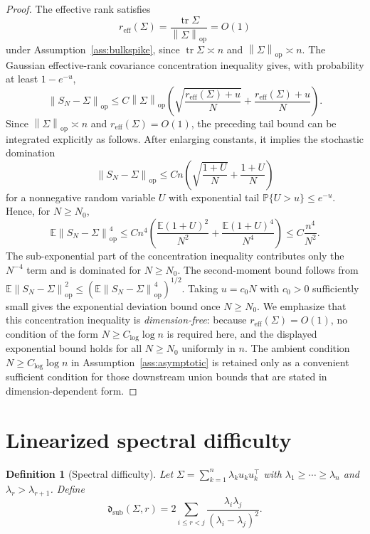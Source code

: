 \documentclass[11pt]{article}
\theoremstyle{tightplain}
\theoremstyle{tightdef}
\newtheorem{definition}[theorem]{Definition}
\DeclareMathOperator{\tr}{tr}
\DeclareMathOperator{\op}{op}
\newcommand{\E}{\mathbb E}
\newcommand{\Prob}{\mathbb P}
\newcommand{\norm}[1]{\left\lVert #1 \right\rVert}
\newcommand{\dsub}{\mathfrak d_{\mathrm{sub}}}
\begin{document}
\begin{proof}
The effective rank satisfies
\[
r_{\mathrm{eff}}(\Sigma)=\frac{\tr\Sigma}{\norm{\Sigma}_{\op}}=O(1)
\]
under Assumption~\ref{ass:bulkspike}, since $\tr\Sigma\asymp n$ and
$\norm{\Sigma}_{\op}\asymp n$. The Gaussian effective-rank covariance
concentration inequality \cite[Thm.~9]{KoltchinskiiLounici2017} gives, with
probability at least $1-e^{-u}$,
\[
\norm{S_N-\Sigma}_{\op}
\le
C\norm{\Sigma}_{\op}
\left(
\sqrt{\frac{r_{\mathrm{eff}}(\Sigma)+u}{N}}
+
\frac{r_{\mathrm{eff}}(\Sigma)+u}{N}
\right).
\]
Since $\norm{\Sigma}_{\op}\asymp n$ and
$r_{\mathrm{eff}}(\Sigma)=O(1)$, the preceding tail bound can be integrated
explicitly as follows. After enlarging constants, it implies the stochastic
domination
\[
\norm{S_N-\Sigma}_{\op}
\le
C n\left(\sqrt{\frac{1+U}{N}}+\frac{1+U}{N}\right)
\]
for a nonnegative random variable $U$ with exponential tail
$\Prob\{U>u\}\le e^{-u}$. Hence, for $N\ge N_0$,
\[
\E\norm{S_N-\Sigma}_{\op}^4
\le
C n^4\left(
\frac{\E(1+U)^2}{N^2}
+
\frac{\E(1+U)^4}{N^4}
\right)
\le
C\frac{n^4}{N^2}.
\]
The sub-exponential part of the concentration inequality contributes only the
$N^{-4}$ term and is dominated for $N\ge N_0$. The second-moment bound follows
from
$\E\norm{S_N-\Sigma}_{\op}^2\le(\E\norm{S_N-\Sigma}_{\op}^4)^{1/2}$.
Taking $u=c_0N$ with $c_0>0$ sufficiently small gives the exponential deviation
bound once $N\ge N_0$. We emphasize that this concentration inequality is
\emph{dimension-free}: because $r_{\mathrm{eff}}(\Sigma)=O(1)$, no condition of
the form $N\ge C_{\log}\log n$ is required here, and the displayed
exponential bound holds for all $N\ge N_0$ uniformly in $n$. The ambient condition $N\ge C_{\log}\log n$ in
Assumption~\ref{ass:asymptotic} is retained only as a convenient sufficient
condition for those downstream union bounds that are stated in
dimension-dependent form.
\end{proof}

\section{Linearized spectral difficulty}

\begin{definition}[Spectral difficulty]\label{def:dsub}
Let $\Sigma=\sum_{k=1}^n\lambda_k u_k u_k^\top$ with
$\lambda_1\ge\cdots\ge\lambda_n$ and $\lambda_r>\lambda_{r+1}$. Define
\[
\dsub(\Sigma,r)
=2\sum_{i\le r<j}\frac{\lambda_i\lambda_j}{(\lambda_i-\lambda_j)^2}.
\]
\end{definition}
\end{document}

